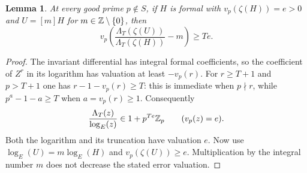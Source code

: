 \documentclass[11pt,a4paper]{article}
\newtheorem{lemma}[theorem]{Lemma}
\begin{document}
\begin{lemma}\label{lem:truncation}
At every good prime $p\notin S$, if $H$ is formal with
$v_p(\zeta(H))=e>0$ and $U=[m]H$ for $m\in\mathbb Z\setminus\{0\}$,
then
\[
 v_p\left(
 \frac{\Lambda_T(\zeta(U))}{\Lambda_T(\zeta(H))}-m
 \right)\ge Te.
\]
\end{lemma}
\begin{proof}
The invariant differential has integral formal coefficients, so
the coefficient of $Z^r$ in its logarithm has valuation at least
$-v_p(r)$. For $r\ge T+1$ and $p>T+1$ one has
$r-1-v_p(r)\ge T$: this is immediate when $p\nmid r$, while
$p^a-1-a\ge T$ when $a=v_p(r)\ge1$.
Consequently
\[
 \frac{\Lambda_T(z)}{\log_E(z)}\in1+p^{Te}\mathbb Z_p
                         \qquad(v_p(z)=e).
\]
Both the logarithm and its truncation have valuation $e$.
Now use $\log_E(U)=m\log_E(H)$ and
$v_p(\zeta(U))\ge e$. Multiplication by the integral number
$m$ does not decrease the stated error valuation.
\end{proof}
\end{document}
